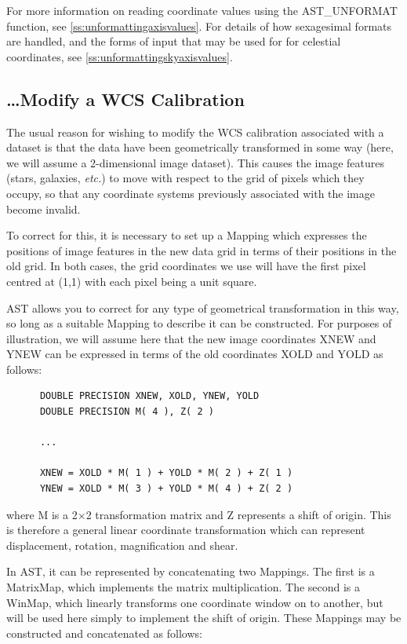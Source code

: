 \documentclass[twoside,11pt]{article}
\newcommand{\htmlref}[2]{#1}
\newcommand{\secref}[1]{\S\ref{#1}}
\renewcommand{\secref}[1]{\ref{#1}}
\begin{document}
For more information on reading coordinate values using the
\htmlref{AST\_UNFORMAT}{AST_UNFORMAT} function, see \secref{ss:unformattingaxisvalues}. For
details of how sexagesimal formats are handled, and the forms of input
that may be used for for celestial coordinates, see
\secref{ss:unformattingskyaxisvalues}.

\subsection{\label{ss:howtomodifywcs}\ldots Modify a WCS Calibration}

The usual reason for wishing to modify the WCS calibration associated
with a dataset is that the data have been geometrically transformed in
some way (here, we will assume a 2-dimensional image dataset). This
causes the image features (stars, galaxies, {\em{etc.}}) to move with
respect to the grid of pixels which they occupy, so that any
coordinate systems previously associated with the image become
invalid.

To correct for this, it is necessary to set up a \htmlref{Mapping}{Mapping} which
expresses the positions of image features in the new data grid in
terms of their positions in the old grid. In both cases, the grid
coordinates we use will have the first pixel centred at (1,1) with
each pixel being a unit square.

AST allows you to correct for any type of geometrical transformation
in this way, so long as a suitable Mapping to describe it can be
constructed. For purposes of illustration, we will assume here that
the new image coordinates XNEW and YNEW can be expressed in terms of
the old coordinates XOLD and YOLD as follows:

\small
\begin{verbatim}
      DOUBLE PRECISION XNEW, XOLD, YNEW, YOLD
      DOUBLE PRECISION M( 4 ), Z( 2 )

      ...

      XNEW = XOLD * M( 1 ) + YOLD * M( 2 ) + Z( 1 )
      YNEW = XOLD * M( 3 ) + YOLD * M( 4 ) + Z( 2 )
\end{verbatim}
\normalsize

where M is a 2$\times$2 transformation matrix and Z represents a shift
of origin. This is therefore a general linear coordinate
transformation which can represent displacement, rotation,
magnification and shear.

In AST, it can be represented by concatenating two Mappings. The first
is a \htmlref{MatrixMap}{MatrixMap}, which implements the matrix multiplication. The second
is a \htmlref{WinMap}{WinMap}, which linearly transforms one coordinate window on to
another, but will be used here simply to implement the shift of
origin. These Mappings may be constructed and concatenated as follows:
\end{document}

